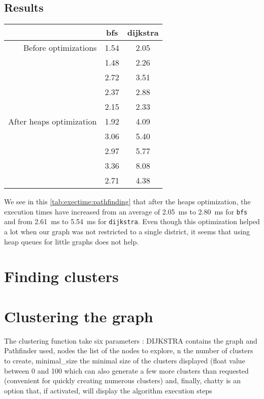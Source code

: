 \documentclass[12pt,english]{article}
\begin{document}
	\subsection{Results}\label{sec:results:2}

	\begin{center}
		\begin{tabular}{r c c}
			& \textbf{\ttfamily bfs} & \textbf{\ttfamily dijkstra}\\
			\hline\hline
			Before optimizations & \num{1.54} & \num{2.05}\\
			& \num{1.48} & \num{2.26}\\
			& \num{2.72} & \num{3.51}\\
			& \num{2.37} & \num{2.88}\\
			& \num{2.15} & \num{2.33}\\
			\hline
			After heaps optimization & \num{1.92} & \num{4.09}\\
			& \num{3.06} & \num{5.40}\\
			& \num{2.97} & \num{5.77}\\
			& \num{3.36} & \num{8.08}\\
			& \num{2.71} & \num{4.38}\\
		\end{tabular}
		\label{tab:exectime:pathfinding}
	\end{center}
	We see in this \autoref{tab:exectime:pathfinding} that after the heaps optimization, the execution times have increased from an average of \SI{2.05}{\milli\second} to \SI{2.80}{\milli\second} for \texttt{bfs} and from \SI{2.61}{\milli\second} to \SI{5.54}{\milli\second} for \texttt{dijkstra}.
	Even though this optimization helped a lot when our graph was not restricted to a single district, it seems that using heap queues for little graphs does not help.

	\section{Finding clusters}\label{sec:step:3}

	\section{Clustering the graph}\label{sec:step:2}

	The clustering function take six parameters : DIJKSTRA contains the graph and Pathfinder used, nodes the list of the
	nodes to explore, n the number of clusters to create, minimal_size the minimal size of the clusters displayed
	(float value between 0 and 100%
	which can also generate a few more clusters than requested (convenient for quickly creating numerous clusters) and,
	finally, chatty is an option that, if activated, will display the algorithm execution steps
\end{document}
